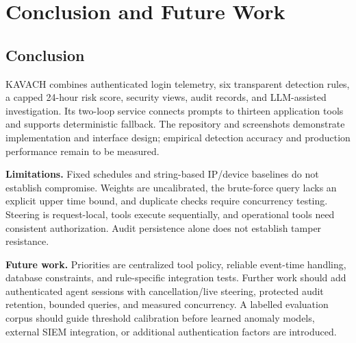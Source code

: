 \chapter{Conclusion and Future Work}
\section{Conclusion}
KAVACH combines authenticated login telemetry, six transparent detection rules, a capped 24-hour risk score, security views, audit records, and LLM-assisted investigation. Its two-loop service connects prompts to thirteen application tools and supports deterministic fallback. The repository and screenshots demonstrate implementation and interface design; empirical detection accuracy and production performance remain to be measured.

\noindent\textbf{Limitations.}
Fixed schedules and string-based IP/device baselines do not establish compromise. Weights are uncalibrated, the brute-force query lacks an explicit upper time bound, and duplicate checks require concurrency testing. Steering is request-local, tools execute sequentially, and operational tools need consistent authorization. Audit persistence alone does not establish tamper resistance.

\noindent\textbf{Future work.}
Priorities are centralized tool policy, reliable event-time handling, database constraints, and rule-specific integration tests. Further work should add authenticated agent sessions with cancellation/live steering, protected audit retention, bounded queries, and measured concurrency. A labelled evaluation corpus should guide threshold calibration before learned anomaly models, external SIEM integration, or additional authentication factors are introduced.
